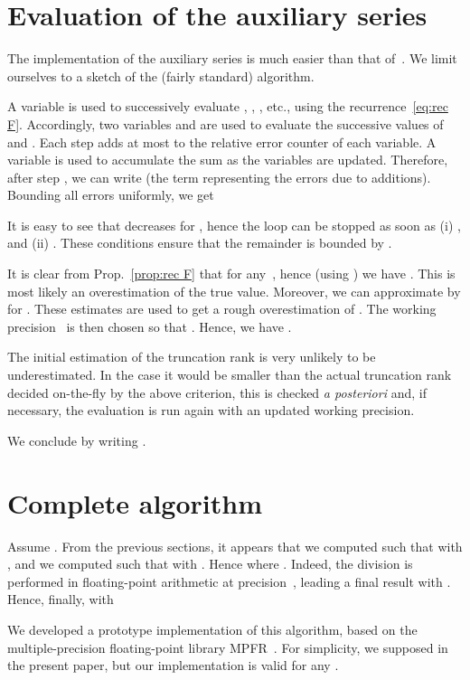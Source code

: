 \documentclass[10pt, conference]{IEEEtran}
\begin{document}
\section{Evaluation of the auxiliary series}
\label{sec:evaluation of F}

The implementation of the auxiliary series  is much easier than that of~.
We limit ourselves to a sketch of the (fairly standard) algorithm.

A variable  is used to successively evaluate , , , etc., using the recurrence~\eqref{eq:rec F}. Accordingly, two variables  and  are used to evaluate the successive values of  and . Each step adds at most  to the relative error counter of each variable. A variable  is used to accumulate the sum as the variables  are updated. Therefore, after step , we can write  (the term  representing the errors due to additions). Bounding all errors uniformly, we get


It is easy to see that  decreases for , hence the loop can be stopped as soon as (i) , and (ii)
. These conditions ensure that the
remainder  is bounded by .

It is clear from Prop.~\ref{prop:rec F} that  for
any~, hence (using ) we have . This is most likely an overestimation of the true value.
Moreover, we can approximate  by  for . These estimates are used to get a rough overestimation of . The working precision~ is then chosen so that . Hence, we have .

The initial estimation of the truncation rank is very unlikely to be
underestimated. In the case it would be smaller than the actual truncation rank
decided on-the-fly by the above criterion, this is checked \emph{a posteriori} and, if necessary, the evaluation is run again with an updated working precision.

We conclude by writing .

\section{Complete algorithm}
\label{sec:implementation}
Assume . From the previous sections, it appears that we computed  such that  with , and we computed  such that  with . Hence  where . Indeed, the division is performed in floating-point arithmetic at precision~, leading a final result  with . Hence, finally,  with 

We developed a prototype implementation of this algorithm, based on the multiple-precision floating-point library MPFR~\cite{FousseHanrotLefevrePelissierZimmermann2007}.
For simplicity, we supposed  in the present paper, but our implementation is valid for any .
\end{document}
